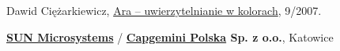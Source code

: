 \documentclass[10pt]{article}
\renewcommand{\section}[2]%
        {\pagebreak[2]\vspace{1.4\baselineskip}%
         \phantomsection\addcontentsline{toc}{section}{#1}%
         \hspace{0in}%
         \marginpar{
         \raggedright \scshape #1}#2}
\newenvironment{outerlist}[1][\enskip\textbullet]%
        {\begin{itemize}[#1]}{\end{itemize}%
         \vspace{-.6\baselineskip}}
\newenvironment{innerlist}[1][\enskip\textbullet]%
        {\begin{compactitem}[#1]}{\end{compactitem}}
\newcommand{\blankline}{\quad\pagebreak[2]}
\begin{document}
%
Dawid Ciężarkiewicz,
\href{http://www.software20.org/pl/linuxplus/issues/9\_2007.html}
                         {Ara – uwierzytelnianie w kolorach},
9/2007.

%
\textbf{\href{http://www.sun.com/}{SUN Microsystems} }/
\textbf{\href{http://www.capgemini.pl/}{Capgemini Polska} Sp. z o.o.}, 
Katowice
\begin{outerlist}

\item[] \textit{
}%
        \hfill \textbf{
}
\begin{innerlist}
\item
\end{innerlist}

\end{outerlist}

\blankline
\end{document}
